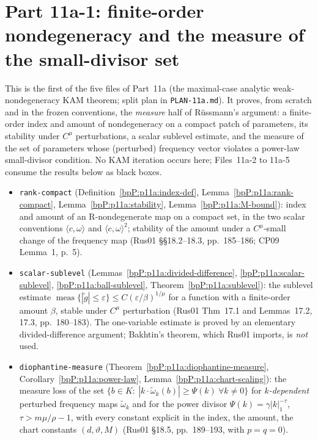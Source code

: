 \section{Part 11a-1: finite-order nondegeneracy and the measure of the small-divisor set}\label{bpP:p11a1}
\begingroup\sloppy

\newcommand{\dgn}[1]{\lvert #1\rvert_{\mathrm{dg}}}
\newcommand{\opn}[1]{\lvert #1\rvert_{\mathrm{op}}}
\newcommand{\Nbd}[1]{K_{#1}}

This is the first of the five files of Part~11a (the maximal-case analytic weak-nondegeneracy KAM theorem; split plan in \texttt{PLAN-11a.md}). It proves, from scratch and in the frozen conventions, the \emph{measure} half of R\"ussmann's argument: a finite-order index and amount of nondegeneracy on a compact patch of parameters, its stability under $C^\mu$ perturbations, a scalar sublevel estimate, and the measure of the set of parameters whose (perturbed) frequency vector violates a power-law small-divisor condition. No KAM iteration occurs here; Files~11a-2 to 11a-5 consume the results below as black boxes.
\begin{itemize}
\item \texttt{rank-compact} (Definition~\ref{bpP:p11a:index-def}, Lemma~\ref{bpP:p11a:rank-compact}, Lemma~\ref{bpP:p11a:stability}, Lemma~\ref{bpP:p11a:M-bound}): index and amount of an R-nondegenerate map on a compact set, in the two scalar conventions $\langle c,\omega\rangle$ and $\langle c,\omega\rangle^2$; stability of the amount under a $C^\mu$-small change of the frequency map (Rus01 \S\S18.2--18.3, pp.~185--186; CP09 Lemma~1, p.~5).
\item \texttt{scalar-sublevel} (Lemmas~\ref{bpP:p11a:divided-difference}, \ref{bpP:p11a:scalar-sublevel}, \ref{bpP:p11a:ball-sublevel}, Theorem~\ref{bpP:p11a:sublevel}): the sublevel estimate $\operatorname{meas}\{|\tilde g|\le\varepsilon\}\le C(\varepsilon/\beta)^{1/\mu}$ for a function with a finite-order amount $\beta$, stable under $C^\mu$ perturbation (Rus01 Thm~17.1 and Lemmas~17.2, 17.3, pp.~180--183). The one-variable estimate is proved by an elementary divided-difference argument; Bakhtin's theorem, which Rus01 imports, is \emph{not} used.
\item \texttt{diophantine-measure} (Theorem~\ref{bpP:p11a:diophantine-measure}, Corollary~\ref{bpP:p11a:power-law}, Lemma~\ref{bpP:p11a:chart-scaling}): the measure loss of the set $\{b\in K:\ |k\cdot\tilde\omega_k(b)|\ge\Psi(k)\ \forall k\ne0\}$ for \emph{$k$-dependent} perturbed frequency maps $\tilde\omega_k$ and for the power divisor $\Psi(k)=\gamma|k|_1^{-\tau}$, $\tau>m\mu/\rho-1$, with every constant explicit in the index, the amount, the chart constants $(d,\vartheta,M)$ (Rus01 \S18.5, pp.~189--193, with $p=q=0$).
\end{itemize}

